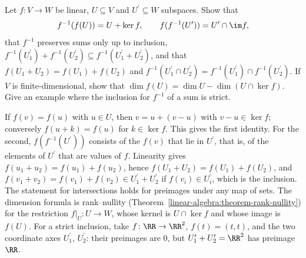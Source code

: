 \begin{exercise}\label{linear-algebra:exercise-images-preimages}
Let $f \colon V \to W$ be linear, $U \subseteq V$ and $U^{\prime} \subseteq W$ subspaces. Show that
\[
f^{-1}(f(U)) = U + \ker f, \qquad f(f^{-1}(U^{\prime})) = U^{\prime} \cap \im f,
\]
that $f^{-1}$ preserves sums only up to inclusion, $f^{-1}(U_1^{\prime}) + f^{-1}(U_2^{\prime}) \subseteq f^{-1}(U_1^{\prime} + U_2^{\prime})$, and that $f(U_1 + U_2) = f(U_1) + f(U_2)$ and $f^{-1}(U_1^{\prime} \cap U_2^{\prime}) = f^{-1}(U_1^{\prime}) \cap f^{-1}(U_2^{\prime})$.
If $V$ is finite-dimensional, show that $\dim f(U) = \dim U - \dim(U \cap \ker f)$. Give an example where the inclusion for $f^{-1}$ of a sum is strict.
\end{exercise}

\begin{solution}
If $f(v) = f(u)$ with $u \in U$, then $v = u + (v - u)$ with $v - u \in \ker f$; conversely $f(u + k) = f(u)$ for $k \in \ker f$. This gives the first identity. For the second, $f(f^{-1}(U^{\prime}))$ consists of the
$f(v)$ that lie in $U^{\prime}$, that is, of the elements of $U^{\prime}$ that are values of $f$. Linearity gives $f(u_1 + u_2) = f(u_1) + f(u_2)$, hence $f(U_1 + U_2) = f(U_1) + f(U_2)$, and
$f(v_1 + v_2) = f(v_1) + f(v_2) \in U_1^{\prime} + U_2^{\prime}$ if $f(v_i) \in U_i^{\prime}$, which is the inclusion. The statement for intersections holds for preimages under any map of sets. The dimension formula is
rank--nullity (Theorem~\ref{linear-algebra:theorem-rank-nullity}) for the restriction $f|_U \colon U \to W$, whose kernel is $U \cap \ker f$ and whose image is $f(U)$. For a strict inclusion, take
$f \colon \RR \to \RR^2$, $f(t) = (t, t)$, and the two coordinate axes $U_1^{\prime}$, $U_2^{\prime}$: their preimages are $0$, but $U_1^{\prime} + U_2^{\prime} = \RR^2$ has preimage $\RR$.
\end{solution}
